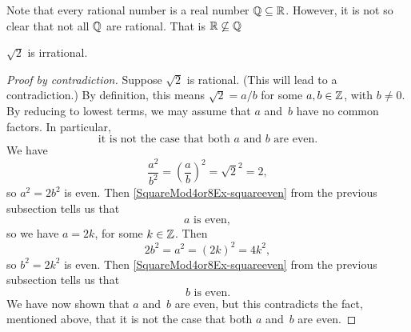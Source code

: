 \documentclass[../MATH-2000-Notes.tex]{subfiles}
\begin{document}
Note that every rational number is a real number \(\mathbb{Q} \subseteq \mathbb{R}\). However, it is not so clear that not all \(\mathbb{Q}\) are rational. That is \(\mathbb{R} \not\subseteq \mathbb{Q}\)

\begin{Proposition}
    {}
    \label{Sqrt2Irrat}
    $\sqrt{2}$ is irrational.
\end{Proposition}

\begin{proof}[Proof by contradiction]
    Suppose $\sqrt{2}$ is rational. (This will lead to a contradiction.) By definition, this means $\sqrt{2} = a/b$ for some $a,b \in \mathbb{Z}$, with $b \neq 0$. By reducing to lowest terms, we may assume that $a$ and~$b$ have no common factors. In particular, 
    $$ \text{it is not the case that both $a$ and~$b$ are even.}$$
    We have 
        $$ \frac{a^2}{b^2} = \left(\frac{a}{b}\right)^2 = \sqrt{2}^2 = 2 ,$$
    so $a^2 = 2b^2$ is even. Then \ref{SquareMod4or8Ex-squareeven} from the previous subsection tells us that 
        $$ \text{$a$~is even}, $$
    so we have $a = 2k$, for some $k \in \mathbb{Z}$. Then
        $$2b^2 = a^2 = (2k)^2 = 4k^2 ,$$
    so $b^2 = 2k^2$ is even. Then \ref{SquareMod4or8Ex-squareeven} from the previous subsection tells us that 
        $$ \text{$b$~is even}. $$
    We have now shown that $a$ and~$b$ are even, but this contradicts the fact, mentioned above, that it is not the case that both $a$ and~$b$ are even.
\end{proof}
\end{document}
